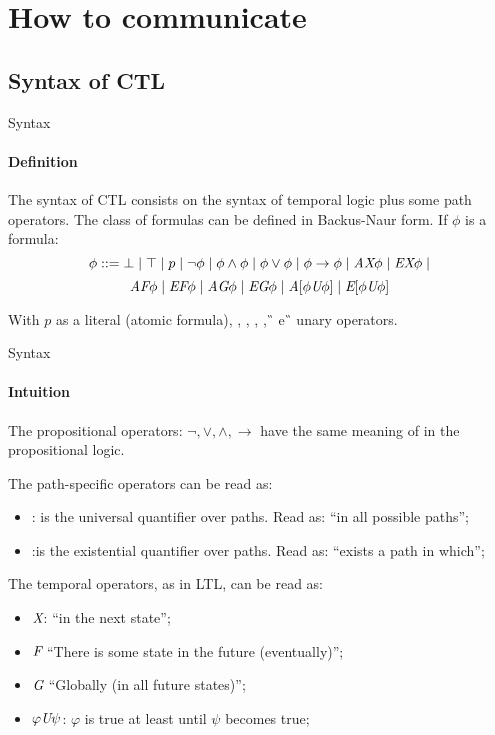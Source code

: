\section{How to communicate}
\subsection{Syntax of CTL}
\begin{frame}{Syntax}
	\framesubtitle{Definition}
	The syntax of CTL consists on the syntax of temporal logic plus some path operators. The class of formulas can be defined in Backus-Naur form. If $\phi$ is a formula: \pause
	$$\phi ::= \bot \; | \; \top \; | \; p \; | \; \neg \phi \; | \; \phi \land \phi \; | \; \phi \lor \phi \; | \; \phi \to \phi \; | \; \textit{A}\textit{X} \phi \; | \; \textit{E}\textit{X} \phi \; | $$
	$$\textit{A}\textit{F} \phi \; | \; \textit{E}\textit{F} \phi \; | \; \textit{A}\textit{G} \phi \; | \; \textit{E}\textit{G} \phi \; | \; \textit{A}[\phi \textit{U} \phi] \; | \; \textit{E}[\phi \textit{U} \phi]$$\pause
	
	With $p$ as a literal (atomic formula), \A\X, \E\X, \A\F, \E\F, \A\G \, e \E\G \, unary operators.
	
\end{frame}

\begin{frame}{Syntax}
	\framesubtitle{Intuition}
	The propositional operators: $\neg, \lor, \land, \to$ have the same meaning of in the propositional logic.\pause
	
	The path-specific operators can be read as: \pause
    \begin{itemize}
		\item 
		{
			\A: is the universal quantifier over paths. Read as: ``in all possible paths'';
			\pause
		}
		\item 
		{
			\E:is the existential quantifier over paths. Read as: ``exists a path in which'';
			\pause
		}
	\end{itemize}
	
    The temporal operators, as in LTL, can be read as:
	\begin{itemize}
    	\item 
    	{
    		$\textit{X}$: ``in the next state'';
    		\pause
    	}
    	\item 
    	{
    		$\textit{F}$ ``There is some state in the future (eventually)'';
    		\pause
    	}
    	\item
    	{
    		$\textit{G}$ ``Globally (in all future states)'';
    		\pause
    	}
    	\item
    	{
    		$\varphi \textit{U} \psi$: $\varphi$ is true at least until $\psi$ becomes true;	
    	}
    \end{itemize}

\end{frame}

